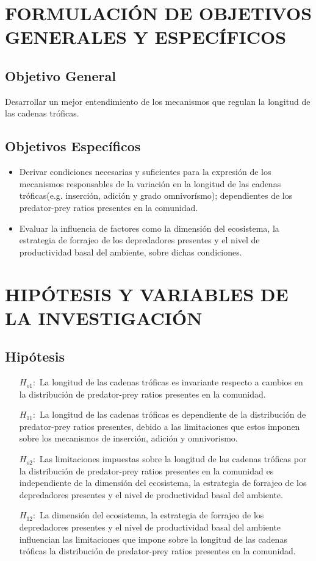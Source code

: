 \documentclass[a4paper,11pt]{article}
\begin{document}
\section{FORMULACI\'ON DE OBJETIVOS GENERALES Y ESPEC\'IFICOS}
\subsection{Objetivo General}
Desarrollar un mejor entendimiento de los mecanismos que regulan la longitud de las cadenas tr\'oficas.
\subsection{Objetivos Espec\'ificos}
\begin{itemize}
\item Derivar condiciones necesarias y suficientes para la expresi\'on de los mecanismos responsables de la variaci\'on en la longitud de las cadenas tr\'oficas(e.g. inserci\'on, adici\'on y  grado omnivor\'ismo); dependientes de los predator-prey ratios presentes en la comunidad.
\item Evaluar la influencia de factores como la dimensi\'on del ecosistema, la estrategia de forrajeo de los depredadores presentes y el nivel de productividad basal del ambiente, sobre dichas condiciones.
\end{itemize}
\section{HIP\'OTESIS Y VARIABLES DE LA INVESTIGACI\'ON}
\subsection{Hip\'otesis}
\begin{itemize}
\item[$H_{o1}:$] La longitud de las cadenas tr\'oficas es invariante respecto a cambios en la distribuci\'on de predator-prey ratios presentes en la comunidad.
\item[$H_{11}:$] La longitud de las cadenas tr\'oficas es dependiente de la distribuci\'on de predator-prey ratios presentes, debido a las limitaciones que estos imponen sobre los mecanismos de inserci\'on, adici\'on y omnivorismo.
\item[$H_{o2}:$] Las limitaciones impuestas sobre la longitud de las cadenas tr\'oficas por la distribuci\'on de predator-prey ratios presentes en la comunidad es independiente de la dimensi\'on del ecosistema, la estrategia de forrajeo de los depredadores presentes y el nivel de productividad basal del ambiente.
\item[$H_{12}:$] La dimensi\'on del ecosistema, la estrategia de forrajeo de los depredadores presentes y el nivel de productividad basal del ambiente influencian las limitaciones que impone sobre la longitud de las cadenas tr\'oficas la distribuci\'on de  predator-prey ratios presentes en la comunidad.
\end{itemize}
\end{document}
